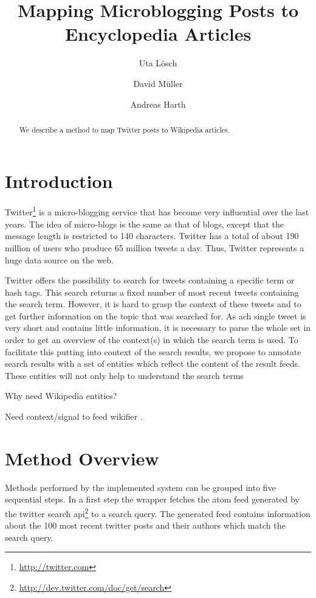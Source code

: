\documentclass{llncs}
\title{Mapping Microblogging Posts to Encyclopedia Articles}
\author{Uta L\"{o}sch \and David M\"{u}ller \and Andreas Harth}
\institute{
	Karlsruhe Institute of Technology (KIT), D-76131 Karlsruhe, Germany\\ 
	\email{uta.loesch@kit.edu},\\
	\email{david.mueller@student.kit.edu},\\
	\email{harth@kit.edu}
}
\begin{document}
\maketitle

\begin{abstract}
We describe a method to map Twitter posts to Wikipedia articles.
\end{abstract}

\section{Introduction}

Twitter\footnote{\url{http://twitter.com}} is a micro-blogging service that has become very influential over the last years. The idea of micro-blogs is the same as that of blogs, except that the message length is restricted to 140 characters. Twitter has a total of about 190 million of users who produce 65 million tweets a day. Thus, Twitter represents a huge data source on the web.

Twitter offers the possibility to search for tweets containing a specific term or hash tags. This search returns a fixed number of most recent tweets containing the search term. However, it is hard to grasp the context of these tweets and to get further information on the topic that was searched for. As ach single tweet is very short and contains little information, it is necessary to parse the whole set in order to get an overview of the context(s) in which the search term is used. To facilitate this putting into context of the search results, we propose to annotate search results with a set of entities which reflect the content of the result feeds. These entities will not only help to understand the search terms

Why need Wikipedia entities?

Need context/signal to feed wikifier \cite{key:wikifier}.

\section{Method Overview}

Methods performed by the implemented system can be grouped into five sequential
steps. 
In a first step the wrapper fetches the atom feed generated by the
twitter search api\footnote{\url{http://dev.twitter.com/doc/get/search}} to a
search query. The generated feed contains information about the 100 most recent
twitter posts and their authors which match the search query.
\end{document}
